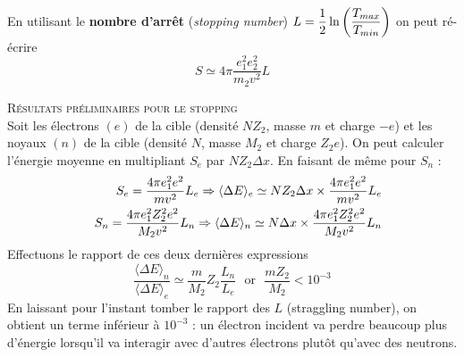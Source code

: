 \ \\

En utilisant le \textbf{nombre d'arrêt} (\textit{stopping number}) $\displaystyle 
L=\frac{1}{2}\ln{\left(\frac{T_{max}}{T_{min}}\right)}$ on peut ré-écrire
\begin{equation}
S\simeq 4\pi \frac{e_1^2e_2^2}{m_2v^2}L
\end{equation}

\textsc{Résultats préliminaires pour le stopping}\ \\
Soit les électrons $(e)$ de la cible (densité $NZ_2$, masse $m$ et charge $-e$) et les 
noyaux $(n)$ de la cible (densité $N$, masse $M_2$ et charge $Z_2e$). On peut calculer 
l'énergie moyenne en multipliant $S_e$ par $NZ_2\Delta x$. En faisant de même pour $S_n$ :
\begin{eqnarray}
&&S_e=\frac{4\pi e_1^2e^2}{mv^2}L_e \Rightarrow  \langle \Delta E\rangle_e\simeq NZ_2\Delta x \times \frac{4\pi e_1^2e^2}{mv^2}L_e\vspace{2mm}\\
&&S_n=\frac{4\pi e_1^2Z_2^2e^2}{M_2v^2}L_n \Rightarrow  \langle \Delta E\rangle_n\simeq N\Delta x \times \frac{4\pi e_1^2Z_2^2e^2}{M_2v^2}L_n
\end{eqnarray}
Effectuons le rapport de ces deux dernières expressions
\begin{equation}
\frac{\langle \Delta E\rangle_n}{\langle \Delta E\rangle_e}\simeq \frac{m}{M_2}Z_2\frac{L_n}{L_e}
 {\mbox{~~or~~}} \frac{mZ_2}{M_2}<10^{-3}
\end{equation}
En laissant pour l'instant tomber le rapport des $L$ (straggling number), on obtient un terme 
inférieur à $10^{-3}$ : un électron incident va perdre beaucoup plus d'énergie lorsqu'il va 
interagir avec d'autres électrons plutôt qu'avec des neutrons.

\newpage
